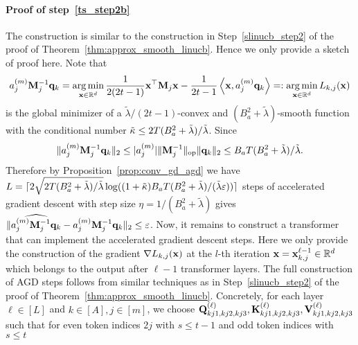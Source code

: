 \paragraph{Proof of step~\ref{ts_step2b}}
The construction is similar to the construction in Step~\ref{slinucb_step2} of the proof of Theorem~\ref{thm:approx_smooth_linucb}. Hence we only provide a sketch of proof here. Note that 
\begin{align*}
    a_j^{(m)}{\mathbf {M}}_j^{-1}{\mathbf {q}}_k=\operatorname*{arg\,min}_{{\mathbf x}\in\mathbb{R}^d}\frac{1}{2(2t-1)}{\mathbf x}^\top{\mathbf {M}}_j{\mathbf x}-\frac{1}{2t-1}\left\langle{\mathbf x}, a_j^{(m)}{\mathbf {q}}_{k}\right\rangle=:\operatorname*{arg\,min}_{{\mathbf x}\in\mathbb{R}^d} L_{k,j}({\mathbf x})
\end{align*}
is the global minimizer of a $\tilde\lambda/(2t-1)$-convex and $(B_a^2+\tilde\lambda)$-smooth function with the conditional number ${\tilde \kappa}\leq 2T(B_a^2+\tilde\lambda)/\tilde\lambda$. Since $$\|a_j^{(m)}{\mathbf {M}}_j^{-1}{\mathbf {q}}_k\|_2\leq|a_j^{(m)}|\|{{\mathbf {M}}_j^{-1}}\|_{\mathrm{op}}\|{\mathbf {q}}_k\|_2\leq B_aT(B_a^2+\tilde\lambda)/\tilde\lambda.$$
Therefore by Proposition~\ref{prop:conv_gd_agd} we have
$L=\lceil2\sqrt{2 T(B_a^2+\tilde\lambda)/\tilde\lambda}\log((1+{\tilde \kappa})B_aT(B_a^2+\tilde\lambda)/(\tilde\lambda\varepsilon))\rceil$ steps of accelerated gradient descent with step size $\eta=1/(B_a^2+\tilde\lambda)$ gives  $\|\widehat{a_j^{(m)}{\mathbf {M}}_j^{-1}{\mathbf {q}}_k}-a_j^{(m)}{\mathbf {M}}_j^{-1}{\mathbf {q}}_k\|_2\leq\varepsilon$. Now, it remains to construct a transformer that can implement the accelerated gradient descent steps. Here we only provide the construction of the gradient $\nabla L_{k,j}({\mathbf x})$ at the $l$-th iteration ${\mathbf x}={\mathbf x}_{k,j}^{\ell-1}\in\mathbb{R}^d$ which belongs to the output after $\ell-1$ transformer layers.  The full construction of AGD steps follows from similar techniques as in Step~\ref{slinucb_step2} of  the proof of  
Theorem~\ref{thm:approx_smooth_linucb}. Concretely, for each layer $\ell\in[L]$ and $k\in[A],j\in[m]$, we choose 
${\mathbf Q}_{kj1,kj2,kj3}^{(\ell)},{\mathbf K}_{kj1,kj2,kj3}^{(\ell)},{\mathbf V}_{kj1,kj2,kj3}^{(\ell)}$ such that for even token indices $2j$ with $s\leq t-1$ and odd token indices with $s\leq t$
